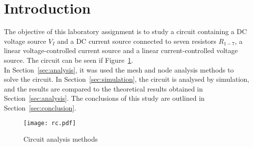 \section{Introduction}
\label{sec:introduction}

\par The objective of this laboratory assignment is to study a circuit containing a
DC voltage source $V_I$ and a DC current source connected to seven resistors $R_{1-7}$, a linear voltage-controlled current source and a  linear current-controlled voltage source. The circuit can be seen if Figure~\ref{fig:rc}.\\



In Section~\ref{sec:analysis}, it was used the mesh and node analysis methods to solve the circuit. In Section~\ref{sec:simulation}, the circuit is analysed by
simulation, and the results are compared to the theoretical results obtained in
Section~\ref{sec:analysis}. The conclusions of this study are outlined in
Section~\ref{sec:conclusion}.

\begin{figure}[h] \centering
\texttt{[image: rc.pdf]}
\caption{Circuit analysis methods}
\label{fig:rc}
\end{figure}

